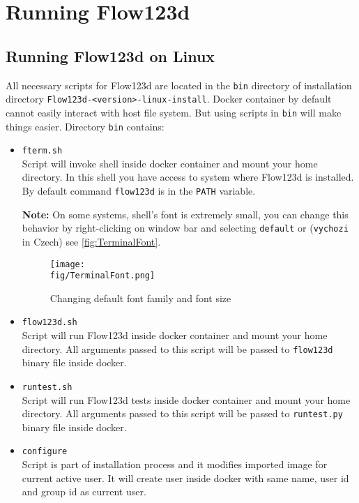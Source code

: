 \section{Running Flow123d}

\subsection{Running Flow123d on Linux}
\label{subsec:running-flow123d-on-linux}
All necessary scripts for Flow123d are located in the \verb'bin' directory of installation directory \verb'Flow123d-<version>-linux-install'.
Docker container by default cannot easily interact with host file system. But using scripts in \verb'bin' will make things easier.
Directory \verb'bin' contains:
\begin{itemize}
	\item \verb'fterm.sh' \\
	 Script will invoke shell inside docker container and mount your home directory.
	 In this shell you have access to system where Flow123d is installed. By default command \verb'flow123d' is in the \verb'PATH' variable.
	 
	\textbf{Note:} On some systems, shell's font is extremely small, you can change this behavior by right-clicking on window bar and selecting 
	\verb'default' or (\verb'vychozi' in Czech) see \autoref{fig:TerminalFont}.
	 \begin{figure}
		 \center
		 \texttt{[image: \\fig/TerminalFont.png]}
		 \caption{Changing default font family and font size}
		 \label{fig:TerminalFont}
	 \end{figure}

	\item \verb'flow123d.sh' \\
	 Script will run Flow123d inside docker container and mount your home  directory.
	 All arguments passed to this script will be passed to \verb'flow123d' binary file inside docker.

	\item \verb'runtest.sh' \\
	 Script will run Flow123d tests inside docker container and mount your home  directory.
	 All arguments passed to this script will be passed to \verb'runtest.py' binary file inside docker.
	 
	\item \verb'configure' \\
	 Script is part of installation process and it modifies imported image for current active user. It will create user inside docker
	 with same name, user id and group id as current user.	 	 
\end{itemize}

